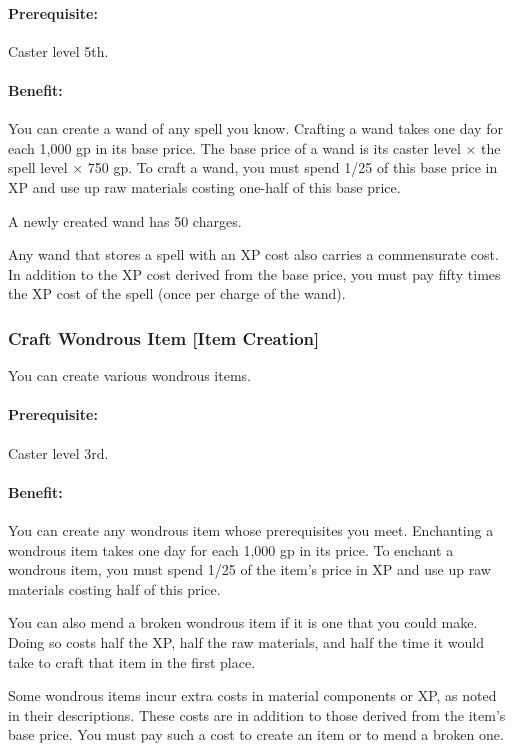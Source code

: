 \paragraph{Prerequisite:}
Caster level 5th.

\paragraph{Benefit:}
You can create a wand of any spell you know. %
Crafting a wand takes one day for each 1,000 gp in its base price. 
The base price of a wand is its caster level $\times$ the spell level $\times$ 750 gp. 
To craft a wand, you must spend 1/25 of this base price in XP and use up raw materials costing one-half of this base price.

A newly created wand has 50 charges.

Any wand that stores a spell with an XP cost also carries a commensurate cost. 
In addition to the XP cost derived from the base price, you must pay fifty times the XP cost of the spell (once per charge of the wand).

\subsubsection[Craft Wondrous Item]{Craft Wondrous Item [Item Creation]}
\label{Feat:CraftWondrousItem}
You can create various wondrous items.

\paragraph{Prerequisite:} Caster level 3rd.

\paragraph{Benefit:}
You can create any wondrous item whose prerequisites you meet. 
Enchanting a wondrous item takes one day for each 1,000 gp in its price. 
To enchant a wondrous item, you must spend 1/25 of the item's price in XP and use up raw materials costing half of this price.

You can also mend a broken wondrous item if it is one that you could make. 
Doing so costs half the XP, half the raw materials, and half the time it would take to craft that item in the first place.

Some wondrous items incur extra costs in material components or XP, as noted in their descriptions. 
These costs are in addition to those derived from the item’s base price. 
You must pay such a cost to create an item or to mend a broken one.

